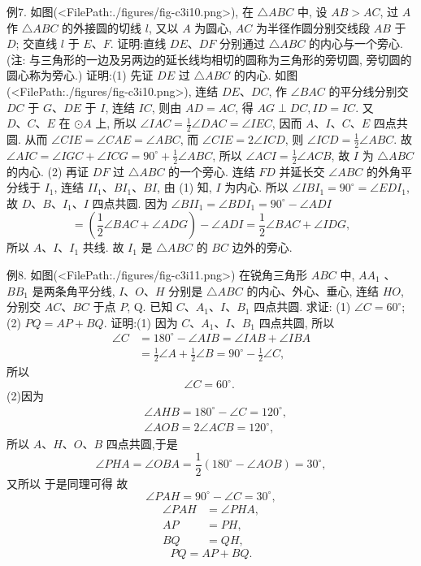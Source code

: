 例7. 如图(<FilePath:./figures/fig-c3i10.png>), 在 $\triangle A B C$ 中, 设 $A B> A C$, 过 $A$ 作 $\triangle A B C$ 的外接圆的切线 $l$, 又以 $A$ 为圆心, $A C$ 为半径作圆分别交线段 $A B$ 于 $D$; 交直线 $l$ 于 $E 、 F$. 证明:直线 $D E 、 D F$ 分别通过 $\triangle A B C$ 的内心与一个旁心.
(注: 与三角形的一边及另两边的延长线均相切的圆称为三角形的旁切圆, 旁切圆的圆心称为旁心.)
证明:(1) 先证 $D E$ 过 $\triangle A B C$ 的内心.
如图(<FilePath:./figures/fig-c3i10.png>), 连结 $D E 、 D C$, 作 $\angle B A C$ 的平分线分别交 $D C$ 于 $G 、 D E$ 于 $I$, 连结 $I C$, 则由 $A D=A C$, 得 $A G \perp D C, I D=I C$.
又 $D 、 C 、 E$ 在 $\odot A$ 上, 所以 $\angle I A C=\frac{1}{2} \angle D A C=\angle I E C$, 因而 $A 、 I 、 C 、 E$ 四点共圆.
从而 $\angle C I E=\angle C A E=\angle A B C$, 而 $\angle C I E=2 \angle I C D$, 则 $\angle I C D= \frac{1}{2} \angle A B C$.
故 $\angle A I C=\angle I G C+\angle I C G=90^{\circ}+\frac{1}{2} \angle A B C$, 所以 $\angle A C I=\frac{1}{2} \angle A C B$,
故 $I$ 为 $\triangle A B C$ 的内心.
(2) 再证 $D F$ 过 $\triangle A B C$ 的一个旁心.
连结 $F D$ 并延长交 $\angle A B C$ 的外角平分线于 $I_1$, 连结 $I I_1 、 B I_1 、 B I$, 由 (1) 知, $I$ 为内心.
所以 $\angle I B I_1=90^{\circ}=\angle E D I_1$, 故 $D 、 B 、 I_1 、 I$ 四点共圆.
因为 $\angle B I I_1=\angle B D I_1=90^{\circ}-\angle A D I$
$$
=\left(\frac{1}{2} \angle B A C+\angle A D G\right)-\angle A D I=\frac{1}{2} \angle B A C+\angle I D G,
$$
所以 $A 、 I 、 I_1$ 共线.
故 $I_1$ 是 $\triangle A B C$ 的 $B C$ 边外的旁心.



例8. 如图(<FilePath:./figures/fig-c3i11.png>) 在锐角三角形 $A B C$ 中, $A A_1$ 、 $B B_1$ 是两条角平分线, $I 、 O 、 H$ 分别是 $\triangle A B C$ 的内心、外心、垂心, 连结 $H O$, 分别交 $A C 、 B C$ 于点 $P$, Q. 已知 $C 、 A_1 、 I 、 B_1$ 四点共圆.
求证: (1) $\angle C= 60^{\circ}$; (2) $P Q=A P+B Q$.
证明:(1) 因为 $C 、 A_1 、 I 、 B_1$ 四点共圆, 所以
$$
\begin{aligned}
\angle C & =180^{\circ}-\angle A I B=\angle I A B+\angle I B A \\
& =\frac{1}{2} \angle A+\frac{1}{2} \angle B=90^{\circ}-\frac{1}{2} \angle C,
\end{aligned}
$$
所以
$$
\angle C=60^{\circ} \text {. }
$$
(2)因为
$$
\begin{aligned}
& \angle A H B=180^{\circ}-\angle C=120^{\circ}, \\
& \angle A O B=2 \angle A C B=120^{\circ},
\end{aligned}
$$
所以 $A 、 H 、 O 、 B$ 四点共圆,于是
$$
\angle P H A=\angle O B A=\frac{1}{2}\left(180^{\circ}-\angle A O B\right)=30^{\circ},
$$
又所以
于是同理可得
故
$$
\angle P A H=90^{\circ}-\angle C=30^{\circ},
$$
$$
\begin{aligned}
\angle P A H & =\angle P H A, \\
A P & =P H, \\
B Q & =Q H,
\end{aligned}
$$
$$
P Q=A P+B Q .
$$



